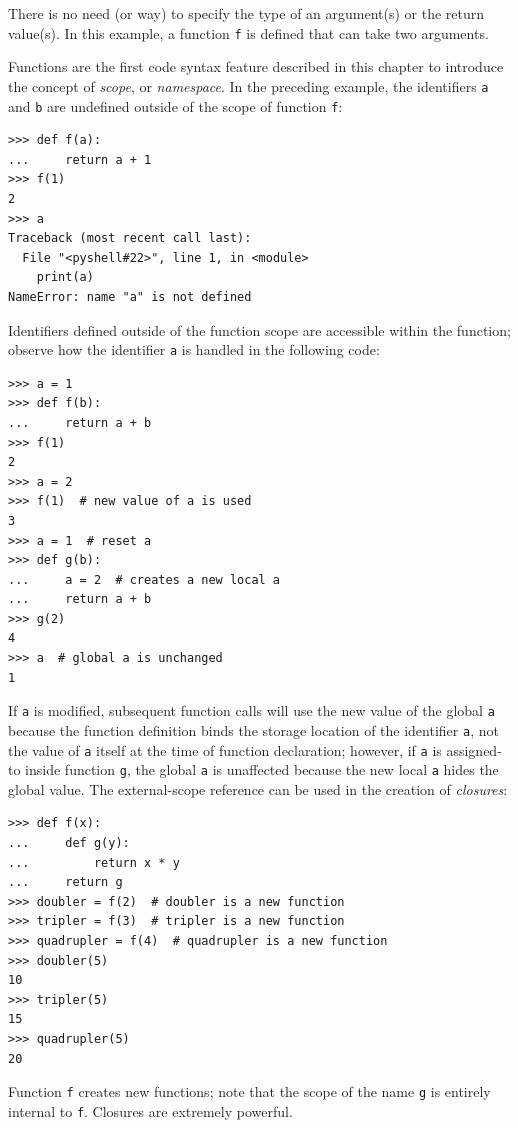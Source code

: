 \documentclass[justified, sixbynine]{tufte-book}
\def\ft{\small\tt}
\theoremstyle{plain}%
\newtheorem * {corollary}{Corollary}
\theoremstyle{definition}
\theoremstyle{remark}
\newtheorem * {remark}{Remark}
\newtheorem * {note}{Note}
\begin{document}
\begin{fullwidth}
There is no need (or way) to specify the type of an argument(s) or the return value(s). In this example, a function {\ft f} is defined that can take two arguments.


Functions are the first code syntax feature described in this chapter to introduce the concept of {\it scope}, or {\it namespace}.  In the preceding example, the identifiers {\ft a} and {\ft b} are undefined outside of the scope of function {\ft f}:
\begin{lstlisting}
>>> def f(a):
...     return a + 1
>>> f(1)
2
>>> a
Traceback (most recent call last):
  File "<pyshell#22>", line 1, in <module>
    print(a)
NameError: name "a" is not defined
\end{lstlisting}

Identifiers defined outside of the function scope are accessible within the function; observe how the identifier {\ft a} is handled in the following code:

\begin{lstlisting}
>>> a = 1
>>> def f(b):
...     return a + b
>>> f(1)
2
>>> a = 2
>>> f(1)  # new value of a is used
3
>>> a = 1  # reset a
>>> def g(b):
...     a = 2  # creates a new local a
...     return a + b
>>> g(2)
4
>>> a  # global a is unchanged
1
\end{lstlisting}

If {\ft a} is modified, subsequent function calls will use the new value of the global {\ft a} because the function definition binds the storage location of the identifier {\ft a}, not the value of {\ft a} itself at the time of function declaration; however, if {\ft a} is assigned-to inside function {\ft g}, the global {\ft a} is unaffected because the new local {\ft a} hides the global value.  The external-scope reference can be used in the creation of {\it closures}:


\begin{lstlisting}
>>> def f(x):
...     def g(y):
...         return x * y
...     return g
>>> doubler = f(2)  # doubler is a new function
>>> tripler = f(3)  # tripler is a new function
>>> quadrupler = f(4)  # quadrupler is a new function
>>> doubler(5)
10
>>> tripler(5)
15
>>> quadrupler(5)
20
\end{lstlisting}

Function {\ft f} creates new functions; note that the scope of the name {\ft g} is entirely internal to {\ft f}.  Closures are extremely powerful.


\end{fullwidth}
\end{document}
